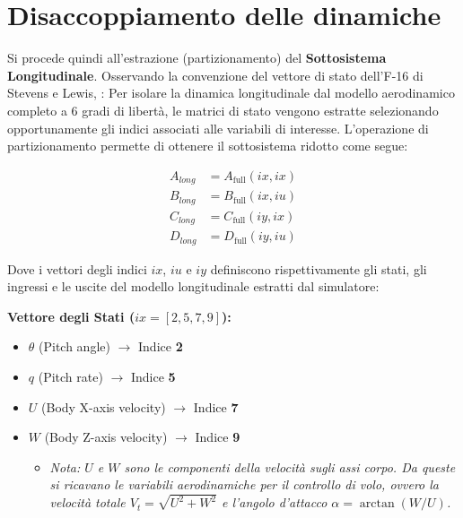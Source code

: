 \section{Disaccoppiamento delle dinamiche}
\label{sec:cap8_3}
Si procede quindi all'estrazione (partizionamento) del \textbf{Sottosistema Longitudinale}. Osservando la convenzione del vettore di stato dell'F-16 di Stevens e Lewis, \cite{stevens2015aircraft}: Per isolare la dinamica longitudinale dal modello aerodinamico completo a 6 gradi di libertà, le matrici di stato vengono estratte selezionando opportunamente gli indici associati alle variabili di interesse. L'operazione di partizionamento permette di ottenere il sottosistema ridotto come segue:

\begin{equation}
	\begin{aligned}
		A_{long} &= A_{\text{full}}(ix, ix) \\
		B _{long}&= B_{\text{full}}(ix, iu) \\
		C_{long}&= C_{\text{full}}(iy, ix) \\
		D_{long} &= D_{\text{full}}(iy, iu)
	\end{aligned}
\end{equation}

Dove i vettori degli indici $ix$, $iu$ e $iy$ definiscono rispettivamente gli stati, gli ingressi e le uscite del modello longitudinale estratti dal simulatore:

\textbf{Vettore degli Stati ($ix = [2, 5, 7, 9]$):}
\begin{itemize}
	\item $\theta$ (Pitch angle) $\rightarrow$ Indice \textbf{2}
	\item $q$ (Pitch rate) $\rightarrow$ Indice \textbf{5}
	\item $U$ (Body X-axis velocity) $\rightarrow$ Indice \textbf{7}
	\item $W$ (Body Z-axis velocity) $\rightarrow$ Indice \textbf{9}
	\begin{itemize}
		\item[$\circ$] {\small \textit{Nota: $U$ e $W$ sono le componenti della velocità sugli assi corpo. Da queste si ricavano le variabili aerodinamiche per il controllo di volo, ovvero la velocità totale $V_t = \sqrt{U^2 + W^2}$ e l'angolo d'attacco $\alpha = \arctan(W/U)$.}}
	\end{itemize}
\end{itemize}

\vspace{0.3cm}

